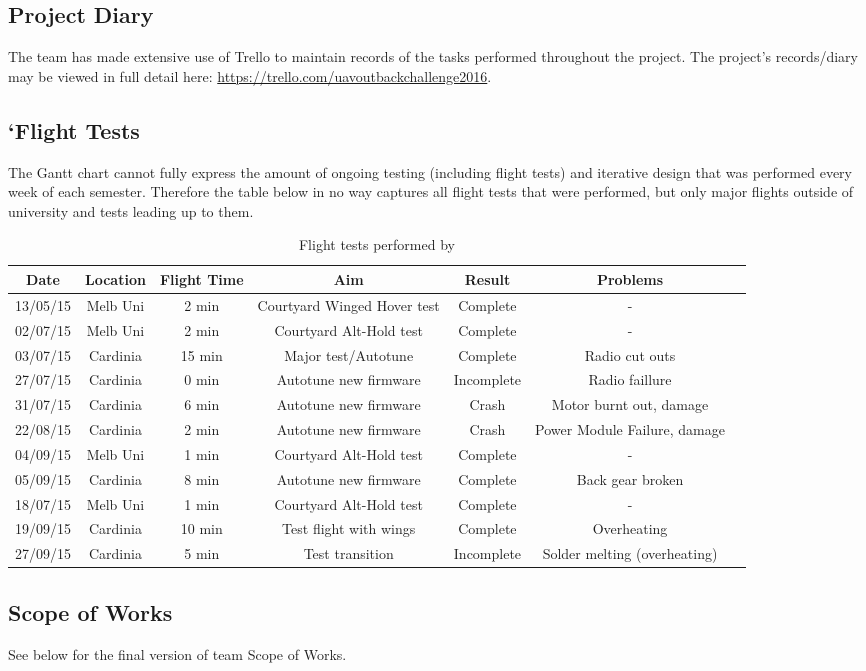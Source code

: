 \subsection{Project Diary}
The team has made extensive use of Trello to maintain records of the tasks performed throughout the project. The project's records/diary may be viewed in full detail here: \url{https://trello.com/uavoutbackchallenge2016}.

\subsection{`Flight Tests}
\label{sec:diary}
 The Gantt chart cannot fully express the amount of ongoing testing (including flight tests) and iterative design that was performed every week of each semester. Therefore the table below in no way captures all flight tests that were performed, but only major flights outside of university and tests leading up to them. 
\begin{table}[!htbp]
	\centering
	\caption{Flight tests performed by \ID}
	\begin{tabular}{|c|c|c|c|c|c|c|}
		\hline Date & Location & Flight Time & Aim & Result & Problems \\ 
		\hline 13/05/15 & Melb Uni & 2 min & Courtyard Winged Hover test & Complete & - \\ 
		\hline 02/07/15 & Melb Uni & 2 min & Courtyard Alt-Hold test & Complete & - \\ 
		\hline 03/07/15 & Cardinia & 15 min & Major test/Autotune & Complete & Radio cut outs \\ 
		\hline 27/07/15 & Cardinia  & 0 min & Autotune new firmware & Incomplete & Radio faillure \\ 
		\hline 31/07/15 & Cardinia  & 6 min & Autotune new firmware & Crash & Motor burnt out, damage  \\ 
		\hline 22/08/15 & Cardinia  & 2 min & Autotune new firmware & Crash & Power Module Failure, damage\\
		\hline 04/09/15 & Melb Uni & 1 min & Courtyard Alt-Hold test & Complete & - \\  
		\hline 05/09/15 & Cardinia  & 8 min & Autotune new firmware & Complete & Back gear broken\\
		\hline 18/07/15 & Melb Uni & 1 min & Courtyard Alt-Hold test & Complete & - \\  
		\hline 19/09/15 & Cardinia  & 10 min & Test flight with wings & Complete & Overheating \\ 
		\hline 27/09/15 & Cardinia  & 5 min & Test transition & Incomplete & Solder melting (overheating) \\ 
		\hline 
	\end{tabular} 
	\label{tab:tests}
\end{table}

\subsection{Scope of Works}
\label{sec:scope}
See below for the final version of team \ID Scope of Works.

